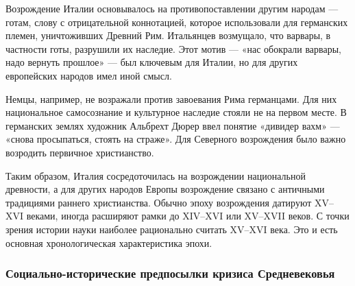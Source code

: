 Возрождение Италии основывалось на противопоставлении другим народам --- готам, слову с отрицательной коннотацией, которое использовали для германских племен, уничтоживших Древний Рим. Итальянцев возмущало, что варвары, в частности готы, разрушили их наследие.
Этот мотив --- «нас обокрали варвары, надо вернуть прошлое» --- был ключевым для Италии, но для других европейских народов имел иной смысл. 

Немцы, например, не возражали против завоевания Рима германцами. Для них национальное самосознание и культурное наследие стояли не на первом месте.
В германских землях художник Альбрехт Дюрер ввел понятие «дивидер вахм» --- «снова просыпаться, стоять на страже». Для Северного возрождения было важно возродить первичное христианство.

Таким образом, Италия сосредоточилась на возрождении национальной древности, а для других народов Европы возрождение связано с античными традициями раннего христианства.
Обычно эпоху возрождения датируют XV–XVI веками, иногда расширяют рамки до XIV–XVI или XV–XVII веков. С точки зрения истории науки наиболее рационально считать XV–XVI века. Это и есть основная хронологическая характеристика эпохи.


\subsubsection{Социально-исторические предпосылки кризиса Средневековья}





